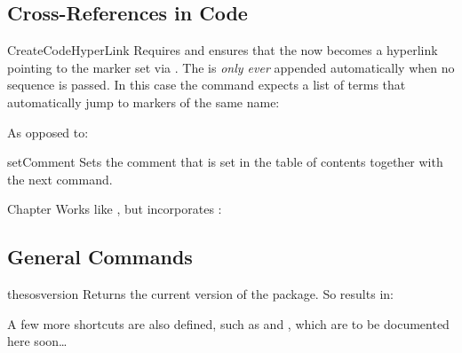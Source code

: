 \documentclass{sopra-base}
\begin{document}
\subsection{Cross-References in Code}

\begin{command}{CreateCodeHyperLink}{}
    Requires  and ensures that the  now becomes a hyperlink pointing to the marker  set via \blatex{\\label}. The  is \emph{only ever} appended automatically when no  sequence is passed. In this case the command expects a list of terms that automatically jump to markers of the same name:
\begin{plainlatex}[morekeywords={[5]{\\CreateCodeHyperLink}}]
\end{plainlatex}
    As opposed to:
\begin{plainlatex}[morekeywords={[5]{\\CreateCodeHyperLink}}]
\end{plainlatex}
\end{command}

\begin{command}{setComment}{}
    Sets the comment that is set in the table of contents together with the next  command.
\end{command}

\begin{command}{Chapter}{}
    Works like , but incorporates :
\begin{plainlatex}[morekeywords={[5]{\\setComment,\\Chapter}}]
\end{plainlatex}
\end{command}

\subsection{General Commands}

\begin{command}{thesosversion}{}
    Returns the current version of the package. So  results in: \thesosversion\\
\end{command}

A few more shortcuts are also defined, such as  and , which are to be documented here soon\ldots
\end{document}
